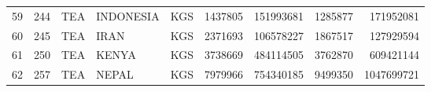 \begin{tabular}{lrlllrrrr}
59 &    244 &       TEA &        INDONESIA &  KGS &           1437805 &          151993681 &           1285877 &          171952081 \\
60 &    245 &       TEA &             IRAN &  KGS &           2371693 &          106578227 &           1867517 &          127929594 \\
61 &    250 &       TEA &            KENYA &  KGS &           3738669 &          484114505 &           3762870 &          609421144 \\
62 &    257 &       TEA &            NEPAL &  KGS &           7979966 &          754340185 &           9499350 &         1047699721 \\
\bottomrule
\end{tabular}
